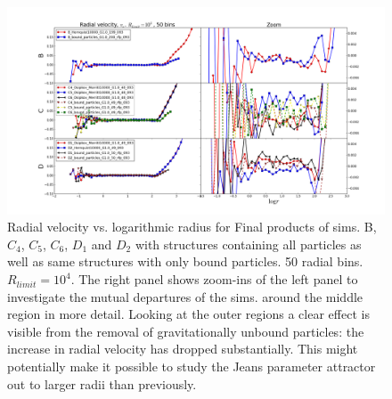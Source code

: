 \begin{figure}
\centering
\includegraphics[width=1.0\linewidth]{img/BC4C5C6D1D2rfp_vr_logr.png}
\caption{Radial velocity vs. logarithmic radius for Final products of sims. B, $C_4$, $C_5$, $C_6$, $D_1$ and $D_2$ with structures containing all particles as well as same structures with only bound particles. 50 radial bins. $R_{limit} = 10^4$. The right panel shows zoom-ins of the left panel to investigate the mutual departures of the sims. around the middle region in more detail. Looking at the outer regions a clear effect is visible from the removal of gravitationally unbound particles: the increase in radial velocity has dropped substantially.
This might potentially make it possible to study the Jeans parameter attractor out to larger radii than previously.}
\label{fig:test}
\end{figure}